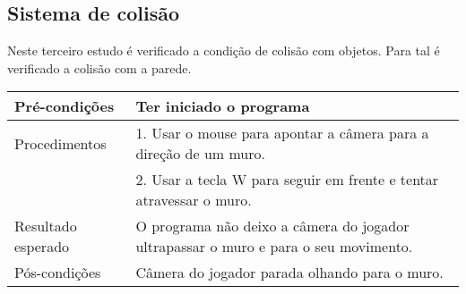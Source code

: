 \subsection{Sistema de colisão}\label{label}

Neste terceiro estudo é verificado a condição de colisão com objetos. Para tal é verificado a colisão com a parede.\\
	
\setlength{\extrarowheight}{1.5pt}
\begin{tabularx}{0.45\textwidth}{lX}
\hline
Pré-condições  & Ter iniciado o programa
\tabularnewline
\hline
Procedimentos 
& 1. Usar o mouse para apontar a câmera para a direção de um muro.\tabularnewline
& 2. Usar a tecla W para seguir em frente e tentar atravessar o muro.
\tabularnewline\hline
Resultado esperado & O programa não deixo a câmera do jogador ultrapassar o muro e para o seu movimento.
\tabularnewline\hline
Pós-condições & Câmera do jogador parada olhando para o muro.
\end{tabularx}


